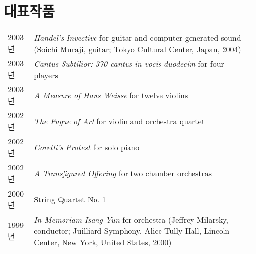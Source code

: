 \documentclass[a4paper,10pt,draft]{article}
\begin{document}
  
  
  
  
  \vspace{2.5mm}
  
  \section*{\normalsize 대표작품}
  
  \hspace*{-0.25cm}
  \begin{tabular}{p{1.5cm} p{12.5cm}}
    2003년 & \textit{Handel’s Invective} for guitar and computer-generated sound (Soichi Muraji, guitar; Tokyo Cultural Center, Japan, 2004)\\[0.5mm]
    
    2003년 & \textit{Cantus Subtilior: 370 cantus in vocis duodecim} for four
    players\\[0.5mm]
    
    2003년 & \textit{A Measure of Hans Weisse} for twelve violins\\[0.5mm]
    
    2002년 & \textit{The Fugue of Art} for violin and orchestra quartet\\[0.5mm]
    
    2002년 & \textit{Corelli’s Protest} for solo piano\\[0.5mm]
    
    2002년 & \textit{A Transfigured Offering} for two chamber orchestras\\[0.5mm]
    
    2000년 & String Quartet No. 1\\[0.5mm]
    
    1999년 & \textit{In Memoriam Isang Yun} for orchestra (Jeffrey Milarsky, conductor; Juilliard Symphony, Alice Tully Hall, Lincoln Center, New York, United States, 2000)
  \end{tabular}
  
\end{document}
